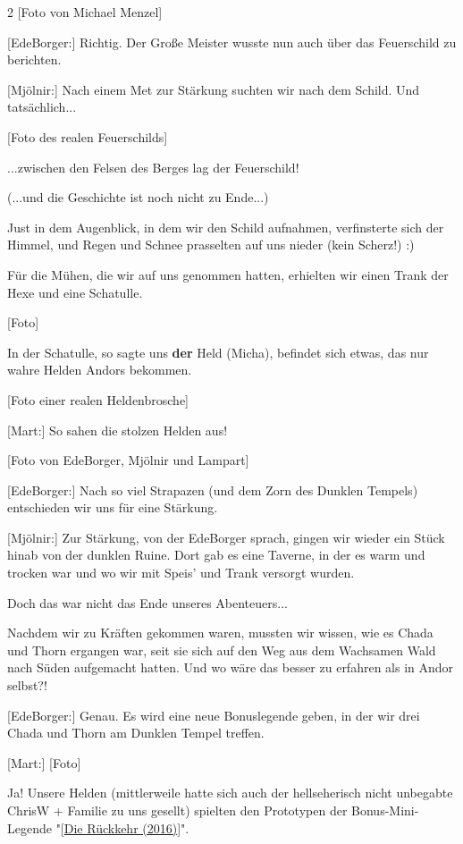 \documentclass[10pt, a4paper, oneside]{book}
\begin{document}
\begin{multicols}{2}
[Foto von Michael Menzel]

[EdeBorger:] Richtig. Der Große Meister wusste nun auch über das Feuerschild zu berichten.

[Mjölnir:] Nach einem Met zur Stärkung suchten wir nach dem Schild. Und tatsächlich...

[Foto des realen Feuerschilds]

...zwischen den Felsen des Berges lag der Feuerschild!

(...und die Geschichte ist noch nicht zu Ende...)

Just in dem Augenblick, in dem wir den Schild aufnahmen, verfinsterte sich der Himmel, und Regen und Schnee prasselten auf uns nieder (kein Scherz!) :)

Für die Mühen, die wir auf uns genommen hatten, erhielten wir einen Trank der Hexe und eine Schatulle.

[Foto]

In der Schatulle, so sagte uns \textbf{der} Held (Micha), befindet sich etwas, das nur wahre Helden Andors bekommen.

[Foto einer realen Heldenbrosche]

[Mart:] So sahen die stolzen Helden aus!

[Foto von EdeBorger, Mjölnir und Lampart]

[EdeBorger:] Nach so viel Strapazen (und dem Zorn des Dunklen Tempels) entschieden wir uns für eine Stärkung.

[Mjölnir:]  Zur Stärkung, von der EdeBorger sprach, gingen wir wieder ein Stück hinab von der dunklen Ruine. Dort gab es eine Taverne, in der es warm und trocken war und wo wir mit Speis' und Trank versorgt wurden.

Doch das war nicht das Ende unseres Abenteuers...

Nachdem wir zu Kräften gekommen waren, mussten wir wissen, wie es Chada und Thorn ergangen war, seit sie sich auf den Weg aus dem Wachsamen Wald nach Süden aufgemacht hatten. Und wo wäre das besser zu erfahren als in Andor selbst?!

[EdeBorger:] Genau. Es wird eine neue Bonuslegende geben, in der wir drei Chada und Thorn am Dunklen Tempel treffen.

[Mart:] [Foto]

Ja! Unsere Helden (mittlerweile hatte sich auch der hellseherisch nicht unbegabte ChrisW + Familie zu uns gesellt) spielten den Prototypen der Bonus-Mini-Legende "[\hyperref[legende-2016-die-rueckkehr]{Die Rückkehr (2016)}]".


\end{multicols}
\end{document}

